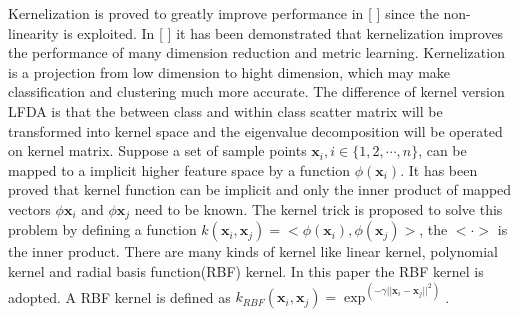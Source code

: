 \documentclass[conference,compsoc]{IEEEtran}
\begin{document}
 Kernelization is proved to greatly improve performance in [ ] since the non-linearity is exploited. In [ ] it has been demonstrated that kernelization improves the performance of many dimension reduction and metric learning. Kernelization is a projection from low dimension to hight dimension, which may make classification and clustering much more accurate.  The difference of kernel version LFDA is that the between class and within class scatter matrix will be transformed into kernel space and the eigenvalue decomposition will be operated on kernel matrix.  Suppose a set of sample points $\bm{x}_i, i\in\{1,2,\cdots, n\} $, can be mapped to a implicit higher feature space by a function $\phi(\bm{x}_i)$. It has been proved that kernel function can be implicit and only the inner product of mapped vectors $\phi{\bm{x}_i}$ and $\phi{\bm{x}_j}$ need to be known. The kernel trick is proposed to solve this problem by defining a function $k(\bm{x}_i,\bm{x}_j) = <\phi(\bm{x}_i),\phi(\bm{x}_j)>$, the $< \cdot >$ is the inner product. There are many kinds of kernel like linear kernel, polynomial kernel and radial basis function(RBF) kernel. In this paper the RBF kernel is adopted. A RBF kernel is defined as $k_{RBF}(\bm{x}_i,\bm{x}_j) = \exp^{(-\gamma||\bm{x}_i-\bm{x}_j||^2)}$. 
 
 
\end{document}
